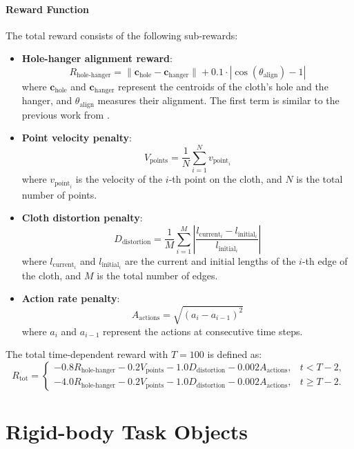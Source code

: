 \paragraph{Reward Function}
The total reward consists of the following sub-rewards:
\begin{itemize}
    \item \textbf{Hole-hanger alignment reward}:
    \[
    R_{\text{hole-hanger}} = \| \mathbf{c}_{\text{hole}} - \mathbf{c}_{\text{hanger}} \| + 0.1 \cdot |\cos(\theta_{\text{align}}) - 1|
    \]
    where $\mathbf{c}_{\text{hole}}$ and $\mathbf{c}_{\text{hanger}}$ represent the centroids of the cloth's hole and the hanger, and $\theta_{\text{align}}$ measures their alignment. The first term is similar to the previous work from  \cite{antonova2021dedo}.
    
    \item \textbf{Point velocity penalty}:
    \[
    V_{\text{points}} = \frac{1}{N} \sum_{i=1}^{N} v_{\text{point}_i}
    \]
    where $v_{\text{point}_i}$ is the velocity of the $i$-th point on the cloth, and $N$ is the total number of points.

    \item \textbf{Cloth distortion penalty}:
    \[
    D_{\text{distortion}} = \frac{1}{M} \sum_{i=1}^{M} \left| \frac{l_{\text{current}_i} - l_{\text{initial}_i}}{l_{\text{initial}_i}} \right|
    \]
    where $l_{\text{current}_i}$ and $l_{\text{initial}_i}$ are the current and initial lengths of the $i$-th edge of the cloth, and $M$ is the total number of edges.

    \item \textbf{Action rate penalty}:
    \[
    A_{\text{actions}} = \sqrt{(a_{i} - a_{i-1})^2}
    \]
    where $a_i$ and $a_{i-1}$ represent the actions at consecutive time steps.
\end{itemize}

The total time-dependent reward with $T=100$ is defined as:
\[
R_\text{tot} = \begin{cases}
    - 0.8 R_{\text{hole-hanger}} - 0.2 V_{\text{points}} - 1.0 D_{\text{distortion}} - 0.002 A_{\text{actions}}, & t < T-2, \\
    - 4.0 R_{\text{hole-hanger}} - 0.2 V_{\text{points}} - 1.0 D_{\text{distortion}} - 0.002 A_{\text{actions}}, & t \geq T-2.
\end{cases}
\]

\section{Rigid-body Task Objects}

